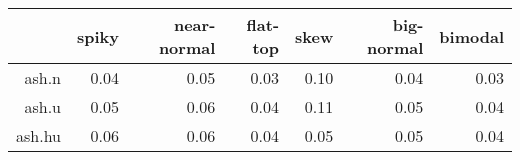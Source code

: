 \begin{tabular}{rrrrrrr}
  \toprule  & spiky & near-normal & flat-top & skew & big-normal & bimodal \\ 
  \midrule ash.n & 0.04 & 0.05 & 0.03 & 0.10 & 0.04 & 0.03 \\ 
  ash.u & 0.05 & 0.06 & 0.04 & 0.11 & 0.05 & 0.04 \\ 
  ash.hu & 0.06 & 0.06 & 0.04 & 0.05 & 0.05 & 0.04 \\ 
   \bottomrule \end{tabular}

